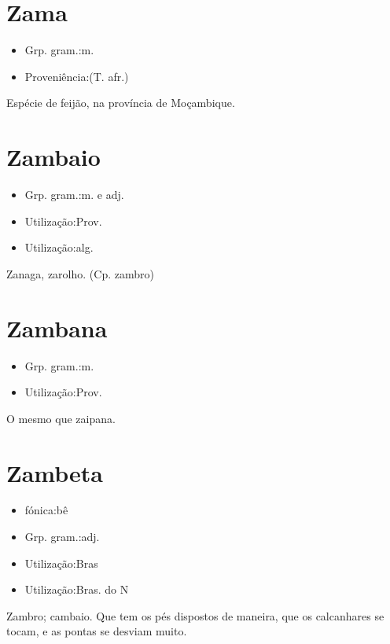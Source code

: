 \section{Zama}
\begin{itemize}
\item {Grp. gram.:m.}
\end{itemize}
\begin{itemize}
\item {Proveniência:(T. afr.)}
\end{itemize}
Espécie de feijão, na província de Moçambique.
\section{Zambaio}
\begin{itemize}
\item {Grp. gram.:m.  e  adj.}
\end{itemize}
\begin{itemize}
\item {Utilização:Prov.}
\end{itemize}
\begin{itemize}
\item {Utilização:alg.}
\end{itemize}
Zanaga, zarolho.
(Cp. \textunderscore zambro\textunderscore )
\section{Zambana}
\begin{itemize}
\item {Grp. gram.:m.}
\end{itemize}
\begin{itemize}
\item {Utilização:Prov.}
\end{itemize}
O mesmo que \textunderscore zaipana\textunderscore .
\section{Zambeta}
\begin{itemize}
\item {fónica:bê}
\end{itemize}
\begin{itemize}
\item {Grp. gram.:adj.}
\end{itemize}
\begin{itemize}
\item {Utilização:Bras}
\end{itemize}
\begin{itemize}
\item {Utilização:Bras. do N}
\end{itemize}
Zambro; cambaio.
Que tem os pés dispostos de maneira, que os calcanhares se tocam, e as pontas se desviam muito.
